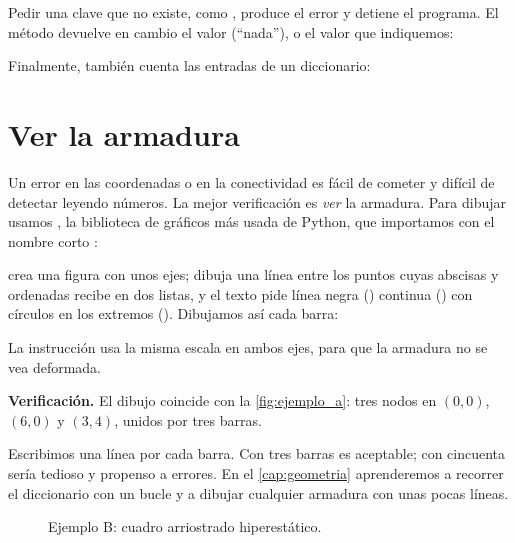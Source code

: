 Pedir una clave que no existe, como , produce el error
 y detiene el programa. El método  devuelve en cambio el
valor  (\enquote{nada}), o el valor que indiquemos:

Finalmente,  también cuenta las entradas de un diccionario:

\section{Ver la armadura}\label{sec:ver_armadura}

Un error en las coordenadas o en la conectividad es fácil de cometer y difícil
de detectar leyendo números. La mejor verificación es \emph{ver} la armadura.
Para dibujar usamos , la biblioteca de gráficos más usada
de Python, que importamos con el nombre corto :

 crea una figura con unos ejes;  dibuja una
línea entre los puntos cuyas abscisas y ordenadas recibe en dos listas, y el
texto  pide línea negra () continua (\py{-}) con círculos en
los extremos (). Dibujamos así cada barra:

La instrucción  usa la misma escala en ambos ejes,
para que la armadura no se vea deformada.

\textbf{Verificación.} El dibujo coincide con la \cref{fig:ejemplo_a}: tres
nodos en $(0, 0)$, $(6, 0)$ y $(3, 4)$, unidos por tres barras.

\begin{python}
Escribimos una línea  por cada barra. Con tres barras es
aceptable; con cincuenta sería tedioso y propenso a errores. En el
\cref{cap:geometria} aprenderemos a recorrer el diccionario  con un
bucle y a dibujar cualquier armadura con unas pocas líneas.
\end{python}

\begin{figure}[ht]
  \centering
  \caption{Ejemplo B: cuadro arriostrado hiperestático.}
  \label{fig:ejemplo_b}
\end{figure}


